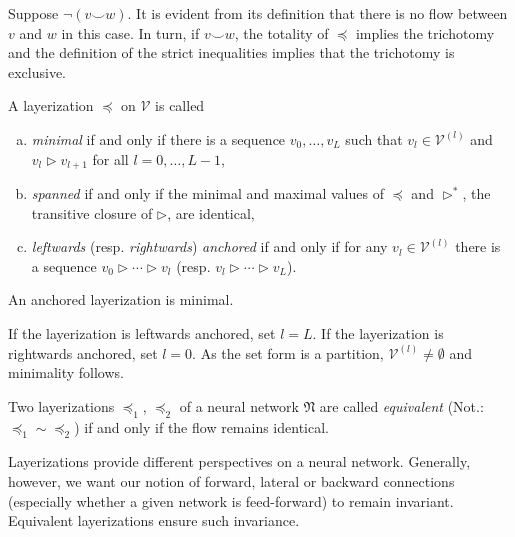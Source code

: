 \documentclass[a4paper,11pt]{report}
\newcommand{\conn}{\smile} %
\begin{document}
\begin{Bew}
Suppose $\neg(v\conn w)$. It is evident from its definition that there is no flow between $v$ and $w$ in this case. In turn, if $v\conn w$, the totality of $\preceq$ implies the trichotomy and the definition of the strict inequalities implies that the trichotomy is exclusive.
\end{Bew}

\begin{Def}
A layerization $\preceq$ on $\mathcal{V}$ is called
\begin{enumerate}[a)]
\item
\emph{minimal} if and only if there is a sequence $v_0,\dotsc,v_L$ such that $v_l\in\mathcal{V}^{(l)}$ and $v_l\triangleright v_{l+1}$ for all $l=0,\dotsc, L-1$,
\item
\emph{spanned} if and only if the minimal and maximal values of $\preceq$ and $\triangleright^*$, the transitive closure of $\triangleright$, are identical, 
\item
\emph{leftwards} (resp. \emph{rightwards}) \emph{anchored} if and only if for any $v_l\in\mathcal{V}^{(l)}$ there is a sequence $v_0\triangleright\dotsb\triangleright v_l$ (resp. $v_l\triangleright\dotsb\triangleright v_L$).
\end{enumerate}
\end{Def}

\begin{Lem}
An anchored layerization is minimal.
\end{Lem}

\begin{Bew}
If the layerization is leftwards anchored, set $l=L$. If the layerization is rightwards anchored, set $l=0$. As the set form is a partition, $\mathcal{V}^{(l)}\ne\emptyset$ and minimality follows.
\end{Bew}

\begin{Def}\label{def:layerization-equivalence}
Two layerizations $\preceq_1$, $\preceq_2$ of a neural network $\mathfrak{N}$ are called \emph{equivalent} (Not.: $\preceq_1\sim\preceq_2$) if and only if the flow remains identical.
\end{Def}

\begin{Par}
Layerizations provide different perspectives on a neural network. Generally, however, we want our notion of forward, lateral or backward connections (especially whether a given network is feed-forward) to remain invariant. Equivalent layerizations ensure such invariance.
\end{Par}
\end{document}
